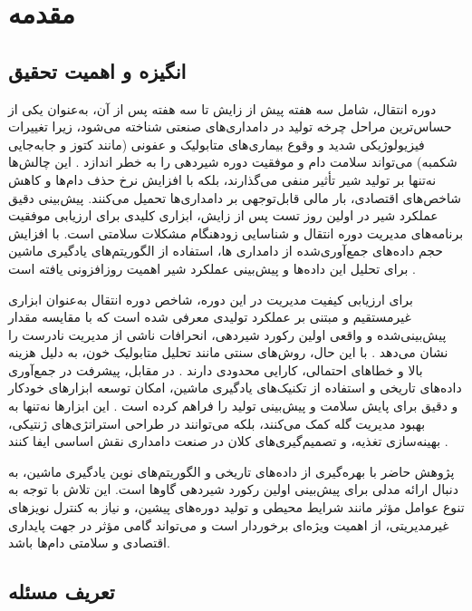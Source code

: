 \chapter{مقدمه}

\section{انگیزه و اهمیت تحقیق}

دوره انتقال، شامل سه هفته پیش از زایش تا سه هفته پس از آن، به‌عنوان یکی از حساس‌ترین مراحل چرخه تولید در دامداری‌های صنعتی شناخته می‌شود، زیرا تغییرات فیزیولوژیکی شدید و وقوع بیماری‌های متابولیک و عفونی (مانند کتوز و جابه‌جایی شکمبه) می‌تواند سلامت دام و موفقیت دوره شیردهی را به خطر اندازد \cite{Drackley1999, LeBlanc2010, Salamone2022}. این چالش‌ها نه‌تنها بر تولید شیر تأثیر منفی می‌گذارند، بلکه با افزایش نرخ حذف دام‌ها و کاهش شاخص‌های اقتصادی، بار مالی قابل‌توجهی بر دامداری‌ها تحمیل می‌کنند. پیش‌بینی دقیق عملکرد شیر در اولین روز تست پس از زایش، ابزاری کلیدی برای ارزیابی موفقیت برنامه‌های مدیریت دوره انتقال و شناسایی زودهنگام مشکلات سلامتی است. با افزایش حجم داده‌های جمع‌آوری‌شده از دامداری ها، استفاده از الگوریتم‌های یادگیری ماشین برای تحلیل این داده‌ها و پیش‌بینی عملکرد شیر اهمیت روزافزونی یافته است \cite{Adriaens2021}.

برای ارزیابی کیفیت مدیریت در این دوره، شاخص دوره انتقال به‌عنوان ابزاری غیرمستقیم و مبتنی بر عملکرد تولیدی معرفی شده است که با مقایسه مقدار پیش‌بینی‌شده و واقعی اولین رکورد شیردهی، انحرافات ناشی از مدیریت نادرست را نشان می‌دهد \cite{Nordlund2006}. با این حال، روش‌های سنتی مانند تحلیل متابولیک خون، به دلیل هزینه بالا و خطاهای احتمالی، کارایی محدودی دارند \cite{DeKoster2019}. در مقابل، پیشرفت در جمع‌آوری داده‌های تاریخی و استفاده از تکنیک‌های یادگیری ماشین، امکان توسعه ابزارهای خودکار و دقیق برای پایش سلامت و پیش‌بینی تولید را فراهم کرده است \cite{GuevaraEscobar2022}. این ابزارها نه‌تنها به بهبود مدیریت گله کمک می‌کنند، بلکه می‌توانند در طراحی استراتژی‌های ژنتیکی، بهینه‌سازی تغذیه، و تصمیم‌گیری‌های کلان در صنعت دامداری نقش اساسی ایفا کنند \cite{Dematawewa2007}.

پژوهش حاضر با بهره‌گیری از داده‌های تاریخی و الگوریتم‌های نوین یادگیری ماشین، به دنبال ارائه مدلی برای پیش‌بینی اولین رکورد شیردهی گاوها است. این تلاش با توجه به تنوع عوامل مؤثر مانند شرایط محیطی و تولید دوره‌های پیشین، و نیاز به کنترل نویزهای غیرمدیریتی، از اهمیت ویژه‌ای برخوردار است و می‌تواند گامی مؤثر در جهت پایداری اقتصادی و سلامتی دام‌ها باشد.

\section{تعریف مسئله}

